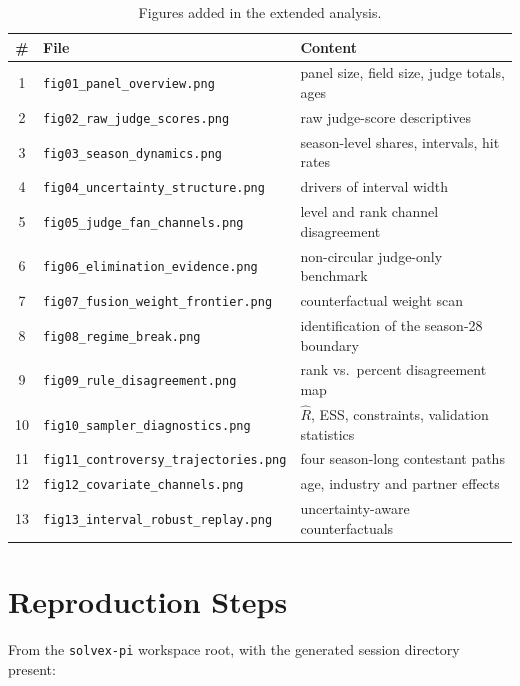 \begin{table}[H]
\centering
\caption{Figures added in the extended analysis.}
\label{tab:figurelist}
\begin{tabular}{c>{\raggedright\arraybackslash}p{7.2cm}>{\raggedright\arraybackslash}p{6.4cm}}
\toprule
\# & File & Content \\
\midrule
1  & \texttt{fig01\_panel\_overview.png}       & panel size, field size, judge totals, ages \\
2  & \texttt{fig02\_raw\_judge\_scores.png}    & raw judge-score descriptives \\
3  & \texttt{fig03\_season\_dynamics.png}      & season-level shares, intervals, hit rates \\
4  & \texttt{fig04\_uncertainty\_structure.png}& drivers of interval width \\
5  & \texttt{fig05\_judge\_fan\_channels.png}  & level and rank channel disagreement \\
6  & \texttt{fig06\_elimination\_evidence.png}& non-circular judge-only benchmark \\
7  & \texttt{fig07\_fusion\_weight\_frontier.png} & counterfactual weight scan \\
8  & \texttt{fig08\_regime\_break.png}         & identification of the season-28 boundary \\
9  & \texttt{fig09\_rule\_disagreement.png}   & rank vs.\ percent disagreement map \\
10 & \texttt{fig10\_sampler\_diagnostics.png} & $\hat R$, ESS, constraints, validation statistics \\
11 & \texttt{fig11\_controversy\_trajectories.png} & four season-long contestant paths \\
12 & \texttt{fig12\_covariate\_channels.png}  & age, industry and partner effects \\
13 & \texttt{fig13\_interval\_robust\_replay.png} & uncertainty-aware counterfactuals \\
\bottomrule
\end{tabular}
\end{table}

\section{Reproduction Steps}\label{app:reproduce}

From the \texttt{solvex-pi} workspace root, with the generated session directory present:

